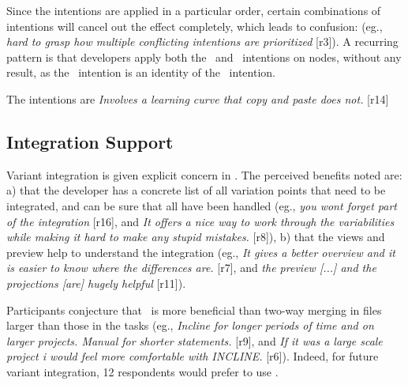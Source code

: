 Since the intentions are applied in a particular order, certain combinations of intentions will cancel out the effect completely, which leads to confusion: (eg., \textit{\bc hard to grasp how multiple conflicting intentions are prioritized\ec} [r3]). A recurring pattern is that developers apply both the \keep~and \keepasf~intentions on nodes, without any result, as the \keep~intention is an identity of the \keepasf~intention.

The intentions are  \textit{\bc Involves a learning curve that copy and paste does not.\ec} [r14]

\subsection{Integration Support}
Variant integration is given explicit concern in \tooln. The perceived benefits noted are: a) that the developer has a concrete list of all variation points that need to be integrated, and can be sure that all have been handled (eg., \textit{\bc you wont forget part of the integration\ec} [r16], and \textit{\bc It offers a nice way to work through the variabilities while making it hard to make any stupid mistakes.\ec} [r8]), b) that the views and preview help to understand the integration (eg., \textit{\bc It gives a better overview and it is easier to know where the differences are.\ec} [r7], and \textit{\bc the preview [...] and the projections [are] hugely helpful\ec} [r11]).

Participants conjecture that \tooln~is more beneficial than two-way merging in files larger than those in the tasks (eg., \textit{\bc Incline for longer periods of time and on larger projects. Manual for shorter statements.\ec} [r9], and \textit{\bc If it was a large scale project i would feel more comfortable with INCLINE.\ec} [r6]). Indeed, for future variant integration, 12 respondents would prefer to use \tooln.



